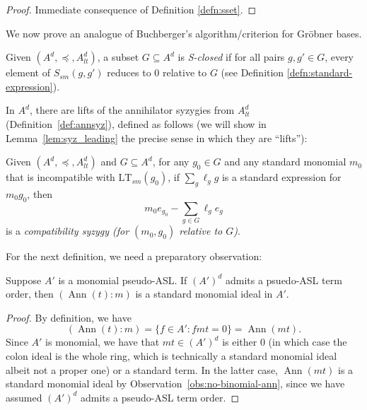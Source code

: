 \documentclass[11pt,reqno]{amsart}
\newcommand{\suchthat}{:}
\DeclareMathOperator{\Ann}{Ann}
\newcommand{\ltsm}{\text{LT}_{sm}}
\newcommand{\Ssm}{S_{sm}}
\theoremstyle{definition}
\numberwithin{equation}{section}
\begin{document}
\begin{proof}
Immediate consequence of Definition \ref{defn:sset}.
\end{proof}

We now prove an analogue of Buchberger's algorithm/criterion for Gr\"{o}bner bases. 

\begin{definition}[store=defnsclosed, note=S-closed] \label{defn:S-closed}
Given $(A^d, \preceq, A_{lt}^d)$, a subset $G \subseteq A^d$ is \emph{S-closed} if for all pairs $g,g' \in G$, every element of $\Ssm(g,g')$ reduces to 0 relative to $G$ (see Definition \ref{defn:standard-expression}).
\end{definition}

In $A^d$, there are lifts of the annihilator syzygies from $A_{lt}^d$ (Definition~\ref{def:annsyz}), defined as follows (we will show in Lemma~\ref{lem:syz_leading} the precise sense in which they are ``lifts''): 

\begin{definition}[store=defncompatsyzygy, note={Compatibility syzygy}]
\label{defn:compat-syzygy}
Given $(A^d, \preceq, A_{lt}^d)$ and $G \subseteq A^d$, for any $g_0 \in G$ and any standard monomial $m_0$ that is incompatible with $\ltsm(g_0)$, if $\sum_g \ell_g g$ is a standard expression for $m_0 g_0$, then
\[
m_0 e_{g_0} - \sum_{g \in G} \ell_g e_g
\]
is a \emph{compatibility syzygy (for $(m_0, g_0)$ relative to $G$)}.
\end{definition}

For the next definition, we need a preparatory observation:

\begin{observation} \label{obs:ann-std-mon}
Suppose $A'$ is a monomial pseudo-ASL. If $(A')^d$ admits a psuedo-ASL term order, then $(\Ann(t) : m)$ is a standard monomial ideal in $A'$.
\end{observation}

\begin{proof}
By definition, we have 
\[
(\Ann(t) : m) = \{f \in A' \suchthat fmt = 0\} = \Ann(mt).
\]
Since $A'$ is monomial, we have that $mt \in (A')^d$ is either 0 (in which case the colon ideal is the whole ring, which is technically a standard monomial ideal albeit not a proper one) or a standard term. In the latter case, $\Ann(mt)$ is a standard monomial ideal by Observation~\ref{obs:no-binomial-ann}, since we have assumed $(A')^d$ admits a pseudo-ASL term order.
\end{proof}
\end{document}
